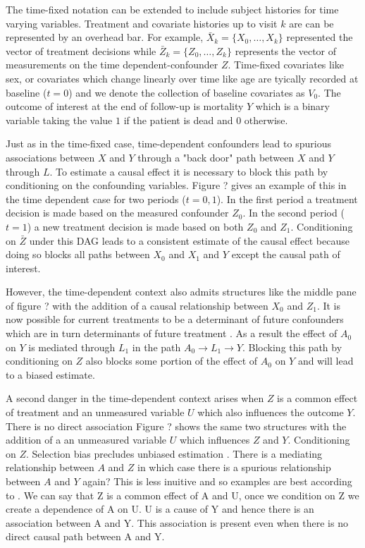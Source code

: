 \documentclass[11pt]{article}
\begin{document}
The time-fixed notation can be extended to include subject histories for
time varying variables. Treatment and covariate histories up to visit
\(k\) are can be represented by an overhead bar. For example,
\(\bar X_{k} = \{X_{0}, \hdots, X_{k}\}\) represented the vector of
treatment decisions while \(\bar Z_{k} = \{Z_{0}, \hdots, Z_{k}\}\)
represents the vector of measurements on the time dependent-confounder
\(Z\). Time-fixed covariates like sex, or covariates which change
linearly over time like age are tyically recorded at baseline
(\(t = 0\)) and we denote the collection of baseline covariates as
\(V_{0}\). The outcome of interest at the end of follow-up is mortality
\(Y\) which is a binary variable taking the value \(1\) if the patient
is dead and \(0\) otherwise. \linebreak 

Just as in the time-fixed case, time-dependent confounders lead to
spurious associations between \(X\) and \(Y\) through a "back door" path
between \(X\) and \(Y\) through \(L\). To estimate a causal effect it is
necessary to block this path by conditioning on the confounding
variables. Figure ? gives an example of this in the time dependent case
for two periods (\(t = 0, 1\)). In the first period a treatment decision
is made based on the measured confounder \(Z_0\). In the second period
(\(t = 1\)) a new treatment decision is made based on both \(Z_0\) and
\(Z_1\). Conditioning on \(\bar Z\) under this DAG leads to a consistent
estimate of the causal effect because doing so blocks all paths between
\(X_0\) and \(X_1\) and \(Y\) except the causal path of interest.
\linebreak

However, the time-dependent context also admits structures like the
middle pane of figure ? with the addition of a causal relationship
between \(X_0\) and \(Z_1\). It is now possible for current treatments
to be a determinant of future confounders which are in turn determinants
of future treatment \citet{Robins2000a}. As a result the effect of
\(A_0\) on \(Y\) is mediated through \(L_1\) in the path
\(A_0 \rightarrow L_1 \rightarrow Y\). Blocking this path by
conditioning on \(Z\) also blocks some portion of the effect of \(A_0\)
on \(Y\) and will lead to a biased estimate. \linebreak

A second danger in the time-dependent context arises when \(Z\) is a
common effect of treatment and an unmeasured variable \(U\) which also
influences the outcome \(Y\). There is no direct association Figure ?
shows the same two structures with the addition of a an unmeasured
variable \(U\) which influences \(Z\) and \(Y\). Conditioning on \(Z\).
Selection bias precludes unbiased estimation \citet{Hernan2004}. There
is a mediating relationship between \(A\) and \(Z\) in which case there
is a spurious relationship between \(A\) and \(Y\) again? This is less
inuitive and so examples are best according to \citet{Cole2010}. We can
say that Z is a common effect of A and U, once we condition on Z we
create a dependence of A on U. U is a cause of Y and hence there is an
association between A and Y. This association is present even when there
is no direct causal path between A and Y. \linebreak
\end{document}
